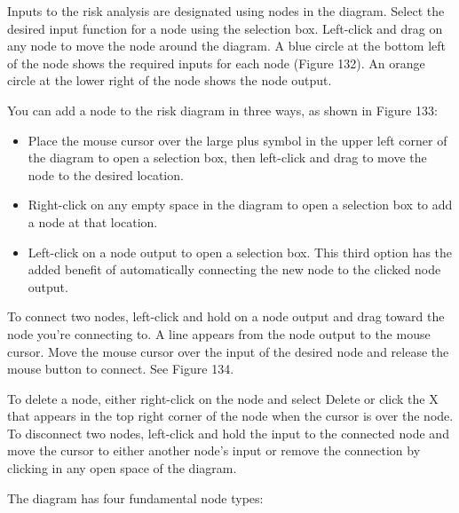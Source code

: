 \documentclass[
]{book}
\begin{document}
Inputs to the risk analysis are designated using nodes in the diagram. Select the desired input function for a node using the selection box. Left-click and drag on any node to move the node around the diagram. A blue circle at the bottom left of the node shows the required inputs for each node (Figure 132). An orange circle at the lower right of the node shows the node output.

You can add a node to the risk diagram in three ways, as shown in Figure 133:

\begin{itemize}
\item
  Place the mouse cursor over the large plus symbol in the upper left corner of the diagram to open a selection box, then left-click and drag to move the node to the desired location.
\item
  Right-click on any empty space in the diagram to open a selection box to add a node at that location.
\item
  Left-click on a node output to open a selection box. This third option has the added benefit of automatically connecting the new node to the clicked node output.
\end{itemize}

To connect two nodes, left-click and hold on a node output and drag toward the node you're connecting to. A line appears from the node output to the mouse cursor. Move the mouse cursor over the input of the desired node and release the mouse button to connect. See Figure 134.

To delete a node, either right-click on the node and select Delete or click the X that appears in the top right corner of the node when the cursor is over the node. To disconnect two nodes, left-click and hold the input to the connected node and move the cursor to either another node's input or remove the connection by clicking in any open space of the diagram.

The diagram has four fundamental node types:
\end{document}
